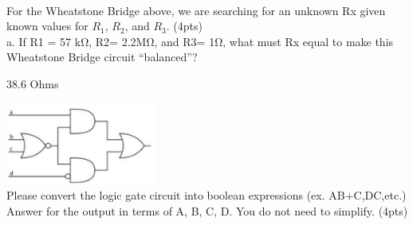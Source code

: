 \documentclass[10pt]{examdesign}
\begin{document}
\begin{shortanswer}[title={Short Answer, 52 pts total},rearrange=no,resetcounter=no]
\begin{question}
        \\For the Wheatstone Bridge above, we are searching for an unknown Rx given known values for $R_1$, $R_2$, and $R_3$. (4pts)
        \\a. If R1 = 57 kΩ, R2= 2.2MΩ, and R3= 1Ω, what must Rx equal to make this Wheatstone Bridge circuit “balanced”?
        \begin{answer}
        38.6 Ohms
        \end{answer}
        \end{question}
        \begin{question}
        \includegraphics[width=5cm]{circuit4.png}
        \\Please convert the logic gate circuit into boolean expressions (ex. AB+C,DC,etc.) Answer for the output in terms of A, B, C, D. You do not need to simplify. (4pts)
        

\end{question}
\end{shortanswer}
\end{document}
